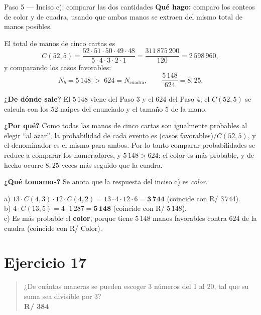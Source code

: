 \documentclass[11pt]{article}
\begin{document}
\begin{paso}{Paso 5 --- Inciso c): comparar las dos cantidades}
\textbf{Qué hago:} comparo los conteos de color y de cuadra, usando que ambas manos se extraen del mismo total de manos posibles.

El total de manos de cinco cartas es
\[
  C(52,5)=\frac{52\cdot 51\cdot 50\cdot 49\cdot 48}{5\cdot 4\cdot 3\cdot 2\cdot 1}=\frac{311\,875\,200}{120}=2\,598\,960 ,
\]
y comparando los casos favorables:
\[
  N_b = 5\,148 \;>\; 624 = N_{\text{cuadra}},\qquad \frac{5\,148}{624}=8{,}25 .
\]

\textbf{¿De dónde sale?} El $5\,148$ viene del Paso 3 y el $624$ del Paso 4; el $C(52,5)$ se calcula con los $52$ naipes del enunciado y el tamaño $5$ de la mano.

\textbf{¿Por qué?} Como todas las manos de cinco cartas son igualmente probables al elegir ``al azar'', la probabilidad de cada evento es (casos favorables)$/C(52,5)$, y el denominador es el mismo para ambos. Por lo tanto comparar probabilidades se reduce a comparar los numeradores, y $5\,148>624$: el color es más probable, y de hecho ocurre $8{,}25$ veces más seguido que la cuadra.

\textbf{¿Qué tomamos?} Se anota que la respuesta del inciso c) es \emph{color}.
\end{paso}

\begin{resp}
a) $13\cdot C(4,3)\cdot 12\cdot C(4,2)=13\cdot 4\cdot 12\cdot 6=\mathbf{3\,744}$ (coincide con R/ 3\,744).\\
b) $4\cdot C(13,5)=4\cdot 1\,287=\mathbf{5\,148}$ (coincide con R/ 5\,148).\\
c) Es más probable el \textbf{color}, porque tiene $5\,148$ manos favorables contra $624$ de la cuadra (coincide con R/ Color).
\end{resp}

\section*{Ejercicio 17}

\begin{quote}
¿De cuántas maneras se pueden escoger 3 números del 1 al 20, tal que su suma sea divisible por 3?\\[2pt]
\textbf{R/ 384}
\end{quote}
\end{document}
